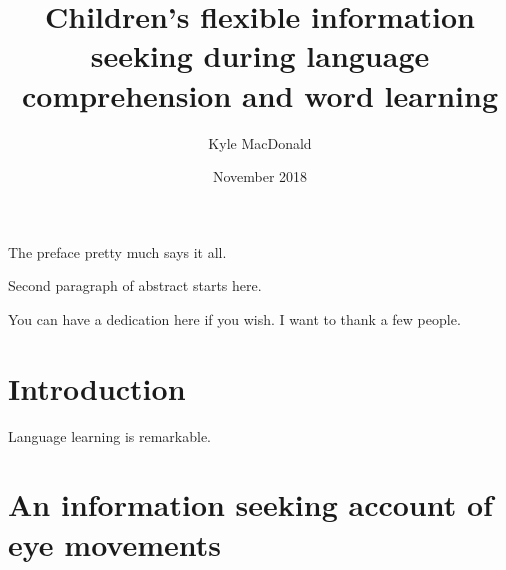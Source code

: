 \documentclass[oneside]{report}
\begin{document}
\title{Children's flexible information seeking during language comprehension
and word learning}
\author{Kyle MacDonald}
\date{November 2018}


\makeatletter
\def\maxwidth{ %
  \ifdim\Gin@nat@width>\linewidth
    \linewidth
  \else
    \Gin@nat@width
  \fi
}
\makeatother

\renewcommand{\contentsname}{Contents}

\setlength{\parskip}{0pt}


\providecommand{\tightlist}{%
  \setlength{\itemsep}{0pt}\setlength{\parskip}{0pt}}




\beforepreface
{}
The preface pretty much says it all.

\par

Second paragraph of abstract starts here.

You can have a dedication here if you wish.
I want to thank a few people.

\afterpreface


\hypertarget{introduction}{%
\chapter*{Introduction}\label{introduction}}

Language learning is remarkable.

\hypertarget{info-seeking}{%
\chapter{An information seeking account of eye
movements}\label{info-seeking}}
\end{document}
